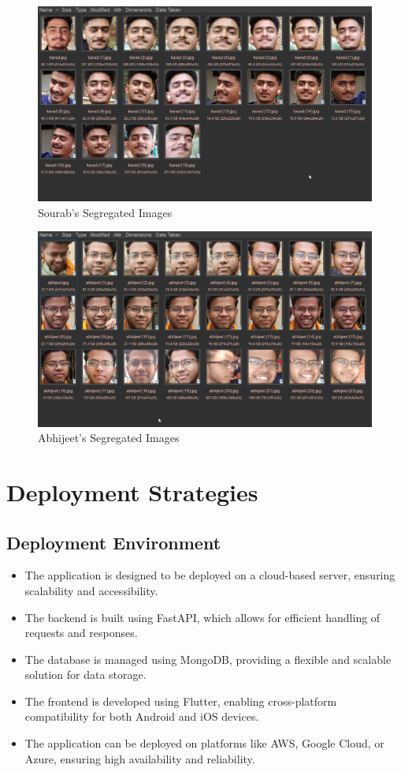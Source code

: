 \documentclass[openany]{report}
\begin{document}
\begin{figure}[H]
    \centering
    \includegraphics[width=.95\textwidth]{../imgs/sourab.png}
    \caption{Sourab's Segregated Images}
\end{figure}

\begin{figure}[H]
    \centering
    \includegraphics[width=.95\textwidth]{../imgs/abhijeet.png}
    \caption{Abhijeet's Segregated Images}
\end{figure}

\chapter{Deployment Strategies}

\section{Deployment Environment}
\begin{itemize}
    \item The application is designed to be deployed on a cloud-based server, ensuring scalability and accessibility.
    \item The backend is built using FastAPI, which allows for efficient handling of requests and responses.
    \item The database is managed using MongoDB, providing a flexible and scalable solution for data storage.
    \item The frontend is developed using Flutter, enabling cross-platform compatibility for both Android and iOS devices.
    \item The application can be deployed on platforms like AWS, Google Cloud, or Azure, ensuring high availability and reliability.
\end{itemize}
\end{document}
